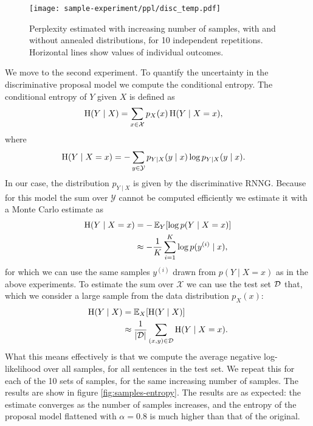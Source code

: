     \begin{figure}[ht]
      \center
    	\texttt{[image: sample-experiment/ppl/disc\_temp.pdf]}
    \caption{Perplexity estimated with increasing number of samples, with and without annealed distributions, for 10 independent repetitions. Horizontal lines show values of individual outcomes.}
    \label{fig:samples-perplexities}
    \end{figure}

    We move to the second experiment. To quantify the uncertainty in the discriminative proposal model we compute the conditional entropy. The conditional entropy of $Y$ given $X$ is defined as
    \begin{align*}
      \operatorname{H}(Y \mid X) &= \sum_{x \in \mathcal{X}} p_X(x) \operatorname{H}(Y \mid X = x),
    \end{align*}
    where
    \begin{align*}
      \operatorname{H}(Y \mid X = x)
        &= - \sum_{y \in \mathcal{Y}} p_{Y \mid X}(y \mid x) \log p_{Y \mid X}(y \mid x).
    \end{align*}
    In our case, the distribution $p_{Y \mid X}$ is given by the discriminative RNNG. Because for this model the sum over $\mathcal{Y}$ cannot be computed efficiently we estimate it with a Monte Carlo estimate as
    \begin{align*}
      \operatorname{H}(Y \mid X = x)
        &= - \operatorname{\mathbb{E}}_Y [ \log p(Y \mid X = x)]  \\
        &\approx - \frac{1}{K} \sum_{i=1}^K \log p(y^{(i)} \mid x),
    \end{align*}
    for which we can use the same samples $y^{(i)}$ drawn from $p(Y \mid X = x)$ as in the above experiments. To estimate the sum over $\mathcal{X}$ we can use the test set $\mathcal{D}$ that, which we consider a large sample from the data distribution $p_X(x)$:
    \begin{align*}
      \operatorname{H}(Y \mid X)
        &= \operatorname{\mathbb{E}}_X [ \operatorname{H}(Y \mid X) ]  \\
        &\approx \frac{1}{\lvert \mathcal{D} \rvert} \sum_{ (x, y) \in \mathcal{D} } \operatorname{H}(Y \mid X = x).  \\
    \end{align*}
    What this means effectively is that we compute the average negative log-likelihood over all samples, for all sentences in the test set. We repeat this for each of the 10 sets of samples, for the same increasing number of samples. The results are show in figure \ref{fig:samples-entropy}. The results are as expected: the estimate converges as the number of samples increases, and the entropy of the proposal model flattened with $\alpha = 0.8$ is much higher than that of the original.

